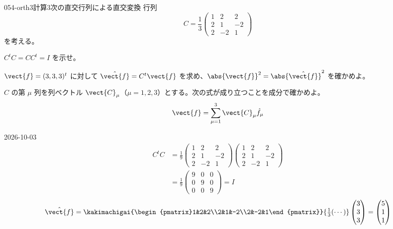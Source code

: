 \documentclass[uplatex,dvipdfmx,a4paper,11pt]{jsarticle}
\begin{document}
\mondaihen
{}
\begin{mondai}{054-orth3}{計算}{3次の直交行列による直交変換}
行列
\[
C=\frac{1}{3}\begin{pmatrix}1&2&2\\2&1&-2\\2&-2&1\end{pmatrix}
\]
を考える。
\begin{shoumon}
  \item $C^{t}C=CC^{t}=I$ を示せ。
  \item $\vect{f}=(3,3,3)^{t}$ に対して $\hat{\vect{f}}=C^{t}\vect{f}$ を求め、$\abs{\vect{f}}^{2}=\abs{\hat{\vect{f}}}^{2}$ を確かめよ。
  \item $C$ の第 $\mu$ 列を列ベクトル $\vect{C}_{\mu}$（$\mu=1,2,3$）とする。次の式が成り立つことを成分で確かめよ。
\[
\vect{f}=\sum_{\mu=1}^{3}\vect{C}_{\mu}\hat{f}_{\mu}
\]
\end{shoumon}
\begin{kotaeutsushi}{2026-10-03}
\begin{align*}
  C^{t}C&=\frac{1}{9}\begin{pmatrix}1&2&2\\2&1&-2\\2&-2&1\end{pmatrix}\begin{pmatrix}1&2&2\\2&1&-2\\2&-2&1\end{pmatrix}\\
  &=\frac{1}{9}\begin{pmatrix}9&0&0\\0&9&0\\0&0&9\end{pmatrix}=I
\end{align*}
\[
  \hat{\vect{f}}=\kakimachigai{\begin{pmatrix}1&2&2\\2&1&-2\\2&-2&1\end{pmatrix}}{\tfrac{1}{3}(\cdots)}\begin{pmatrix}3\\3\\3\end{pmatrix}=\begin{pmatrix}5\\1\\1\end{pmatrix}
\]
\end{kotaeutsushi}
\end{mondai}
\end{document}
